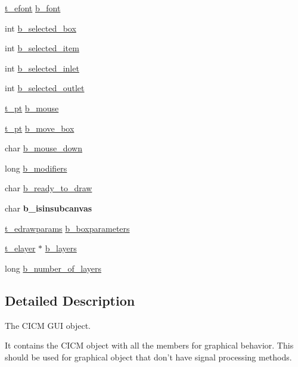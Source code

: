 \begin{DoxyCompactItemize}
\hyperlink{struct__efont}{t\-\_\-efont} \hyperlink{struct__ebox_a4071412a20456f5fcafe2a91cdef11c3}{b\-\_\-font}
\item 
int \hyperlink{struct__ebox_acc1a127070b19ccf6e222d7349c84c96}{b\-\_\-selected\-\_\-box}
\item 
int \hyperlink{struct__ebox_a1f65b6d093e53fd85bed085ce0c5dd8e}{b\-\_\-selected\-\_\-item}
\item 
int \hyperlink{struct__ebox_a0cebb4789c213079e0490e86c10c2893}{b\-\_\-selected\-\_\-inlet}
\item 
int \hyperlink{struct__ebox_acbf0482cb9c6e192e2059775acc1ac86}{b\-\_\-selected\-\_\-outlet}
\item 
\hyperlink{struct__pt}{t\-\_\-pt} \hyperlink{struct__ebox_a8831d355ec1dbb2dca9a68268a977965}{b\-\_\-mouse}
\item 
\hyperlink{struct__pt}{t\-\_\-pt} \hyperlink{struct__ebox_a2b028829ae54f8ccede6bb0d5903f7fd}{b\-\_\-move\-\_\-box}
\item 
char \hyperlink{struct__ebox_a1dc439a4d35e98f78370c81ceadc8ea0}{b\-\_\-mouse\-\_\-down}
\item 
long \hyperlink{struct__ebox_ad230697acdd2d00abb2dc18dd38089d8}{b\-\_\-modifiers}
\item 
char \hyperlink{struct__ebox_a234ea03e103bd45f5fa1d27b8e69b5dd}{b\-\_\-ready\-\_\-to\-\_\-draw}
\item 
\hypertarget{struct__ebox_a4478423a97430b84acbf374f9089f51f}{char {\bfseries b\-\_\-isinsubcanvas}}\label{struct__ebox_a4478423a97430b84acbf374f9089f51f}

\item 
\hyperlink{struct__edrawparams}{t\-\_\-edrawparams} \hyperlink{struct__ebox_a01fa53a36dc717c81755d805a868ad9d}{b\-\_\-boxparameters}
\item 
\hyperlink{struct__elayer}{t\-\_\-elayer} $\ast$ \hyperlink{struct__ebox_ad80949f483467d74761a9e321300d64e}{b\-\_\-layers}
\item 
long \hyperlink{struct__ebox_a84105957ca11a224cf734f350fb23ac9}{b\-\_\-number\-\_\-of\-\_\-layers}
\end{DoxyCompactItemize}


\subsection{Detailed Description}
The C\-I\-C\-M G\-U\-I object. 

It contains the C\-I\-C\-M object with all the members for graphical behavior. This should be used for graphical object that don't have signal processing methods. 

